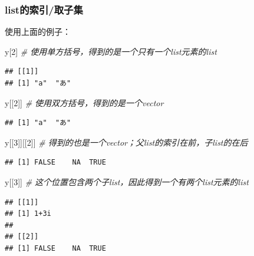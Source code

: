 \documentclass[]{book}
\newenvironment{Shaded}{\begin{snugshade}}{\end{snugshade}}
\newcommand{\CommentTok}[1]{\textcolor[rgb]{0.56,0.35,0.01}{\textit{#1}}}
\newcommand{\DecValTok}[1]{\textcolor[rgb]{0.00,0.00,0.81}{#1}}
\newcommand{\NormalTok}[1]{#1}
\begin{document}
\hypertarget{list-index}{%
\subsubsection{list的索引/取子集}\label{list-index}}

使用上面的例子：

\begin{Shaded}
\begin{Highlighting}[]
\NormalTok{y[}\DecValTok{2}\NormalTok{] }\CommentTok{# 使用单方括号，得到的是一个只有一个list元素的list}
\end{Highlighting}
\end{Shaded}

\begin{verbatim}
## [[1]]
## [1] "a"  "あ"
\end{verbatim}

\begin{Shaded}
\begin{Highlighting}[]
\NormalTok{y[[}\DecValTok{2}\NormalTok{]] }\CommentTok{# 使用双方括号，得到的是一个vector}
\end{Highlighting}
\end{Shaded}

\begin{verbatim}
## [1] "a"  "あ"
\end{verbatim}

\begin{Shaded}
\begin{Highlighting}[]
\NormalTok{y[[}\DecValTok{3}\NormalTok{]][[}\DecValTok{2}\NormalTok{]] }\CommentTok{# 得到的也是一个vector；父list的索引在前，子list的在后}
\end{Highlighting}
\end{Shaded}

\begin{verbatim}
## [1] FALSE    NA  TRUE
\end{verbatim}

\begin{Shaded}
\begin{Highlighting}[]
\NormalTok{y[[}\DecValTok{3}\NormalTok{]] }\CommentTok{# 这个位置包含两个子list，因此得到一个有两个list元素的list}
\end{Highlighting}
\end{Shaded}

\begin{verbatim}
## [[1]]
## [1] 1+3i
## 
## [[2]]
## [1] FALSE    NA  TRUE
\end{verbatim}
\end{document}

